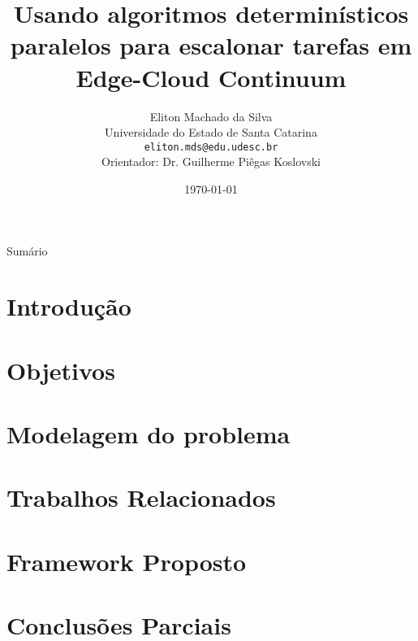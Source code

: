 \documentclass[xcolor=table]{beamer}
\title[]{Usando algoritmos determinísticos paralelos para escalonar tarefas em Edge-Cloud Continuum}
\author[Eliton Machado da Silva]{
    Eliton Machado da Silva\\\smallskip
    {\scriptsize Universidade do Estado de Santa Catarina \\\smallskip
    \vspace{-2mm}
    \texttt{eliton.mds@edu.udesc.br}\\\medskip
    {Orientador: Dr. Guilherme Piêgas Koslovski}\\
    }
}
\date{\today}
\begin{document}
    \begin{frame}
        \titlepage
    \end{frame}

    \begin{frame}[allowframebreaks]{Sumário}
        \tableofcontents
    \end{frame}

    \section[]{Introdução}
    
    

    \section[]{Objetivos}
    

    \section[]{Modelagem do problema}
    

    \section[]{Trabalhos Relacionados}

    \section[]{Framework Proposto}
    
    
    

    \section[]{Conclusões Parciais}
    
    

\end{document}
